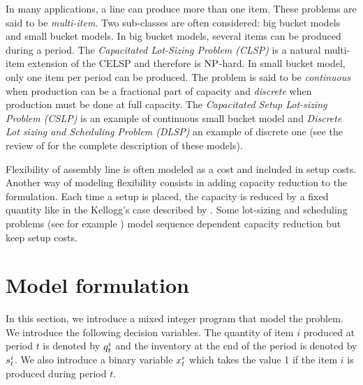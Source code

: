 \medskip

In many applications, a line can produce more than one item.
These problems are said to be \emph{multi-item}.
Two sub-classes are often considered: big bucket models and small bucket models.
In big bucket models, several items can be produced during a period.
The \emph{Capacitated Lot-Sizing Problem (CLSP)} is a natural multi-item extension of the CELSP and therefore is $\operatorname{NP}$-hard.
In small bucket model, only one item per period can be produced.
The problem is said to be \emph{continuous} when production can be a fractional part of capacity and \emph{discrete} when production must be done at full capacity.
The \emph{Capacitated Setup Lot-sizing Problem (CSLP)} is an example of continuous small bucket model and \emph{Discrete Lot sizing and Scheduling Problem (DLSP)} an example of discrete one (see the review of \citet{Gicquel2008} for the complete description of these models).


\medskip


Flexibility of assembly line is often modeled as a cost and included in setup costs.
Another way of modeling flexibility consists in adding capacity reduction to the formulation.
Each time a setup is placed, the capacity is reduced by a fixed quantity like in the Kellogg's case described by \citet[Chapter 4]{Pochet2006}.
Some lot-sizing and scheduling problems (see for example \citet{Guimaraes2014}) model sequence dependent capacity reduction but keep setup costs.



\section{Model formulation}
\label{sec:PDP:deterministic:model}


In this section, we introduce a mixed integer program that model the problem.
We introduce the following decision variables.
The quantity of item $i$ produced at period $t$ is denoted by $q_t^i$ and the inventory at the end of the period is denoted by $s_t^i$.
We also introduce a binary variable $x_t^i$ which takes the value 1 if the item $i$ is produced during period $t$.

